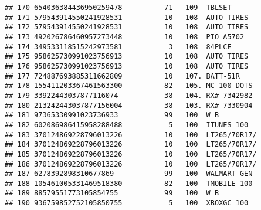 \documentclass[]{article}
\newenvironment{Shaded}{\begin{snugshade}}{\end{snugshade}}
\newcommand{\KeywordTok}[1]{\textcolor[rgb]{0.13,0.29,0.53}{\textbf{#1}}}
\newcommand{\DecValTok}[1]{\textcolor[rgb]{0.00,0.00,0.81}{#1}}
\newcommand{\FloatTok}[1]{\textcolor[rgb]{0.00,0.00,0.81}{#1}}
\newcommand{\StringTok}[1]{\textcolor[rgb]{0.31,0.60,0.02}{#1}}
\newcommand{\OperatorTok}[1]{\textcolor[rgb]{0.81,0.36,0.00}{\textbf{#1}}}
\newcommand{\NormalTok}[1]{#1}
\begin{document}
\begin{verbatim}
## 170 654036384436950259478          71   109  TBLSET      
## 171 579543914550241928531          10   108  AUTO TIRES  
## 172 579543914550241928531          10   108  AUTO TIRES  
## 173 492026786460957273448          10   108  PIO A5702   
## 174 349533118515242973581           3   108  84PLCE      
## 175 958625730991023756913          10   108  AUTO TIRES  
## 176 958625730991023756913          10   108  AUTO TIRES  
## 177 724887693885311662809          10   107. BATT-51R    
## 178 155411203367461563300          82   105. MC 100 DOTS 
## 179 33922443037877116074           38   104. RX# 7342982 
## 180 213242443037877156004          38   103. RX# 7330904 
## 181 97365330991023736933           99   100  W B         
## 182 602086986415958288488           5   100  ITUNES 100  
## 183 370124869228796013226          10   100  LT265/70R17/
## 184 370124869228796013226          10   100  LT265/70R17/
## 185 370124869228796013226          10   100  LT265/70R17/
## 186 370124869228796013226          10   100  LT265/70R17/
## 187 6278392898310677869            99   100  WALMART GEN 
## 188 105461005331469518380          82   100  TMOBILE 100 
## 189 88579551773105854755           99   100  W B         
## 190 936759852752105850755           5   100  XBOXGC 100
\end{verbatim}

\begin{Shaded}
\end{Shaded}
\end{document}
